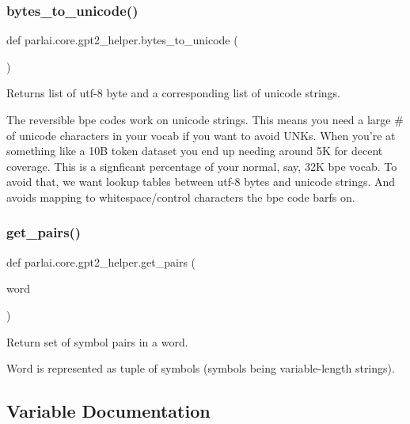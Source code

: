 \subsubsection{\texorpdfstring{bytes\+\_\+to\+\_\+unicode()}{bytes\_to\_unicode()}}
{\footnotesize\ttfamily def parlai.\+core.\+gpt2\+\_\+helper.\+bytes\+\_\+to\+\_\+unicode (\begin{DoxyParamCaption}{ }\end{DoxyParamCaption})}

\begin{DoxyVerb}Returns list of utf-8 byte and a corresponding list of unicode strings.

The reversible bpe codes work on unicode strings. This means you need a large # of
unicode characters in your vocab if you want to avoid UNKs. When you're at something
like a 10B token dataset you end up needing around 5K for decent coverage. This is a
signficant percentage of your normal, say, 32K bpe vocab. To avoid that, we want
lookup tables between utf-8 bytes and unicode strings. And avoids mapping to
whitespace/control characters the bpe code barfs on.
\end{DoxyVerb}
 \mbox{\label{namespaceparlai_1_1core_1_1gpt2__helper_ac5bffa2aece99e43444185ba85dff425}} 
\subsubsection{\texorpdfstring{get\+\_\+pairs()}{get\_pairs()}}
{\footnotesize\ttfamily def parlai.\+core.\+gpt2\+\_\+helper.\+get\+\_\+pairs (\begin{DoxyParamCaption}\item[{}]{word }\end{DoxyParamCaption})}

\begin{DoxyVerb}Return set of symbol pairs in a word.

Word is represented as tuple of symbols (symbols being variable-length strings).
\end{DoxyVerb}
 

\subsection{Variable Documentation}
\mbox{\label{namespaceparlai_1_1core_1_1gpt2__helper_aeb53e5722eee3791e6921df0a571263c}} 
